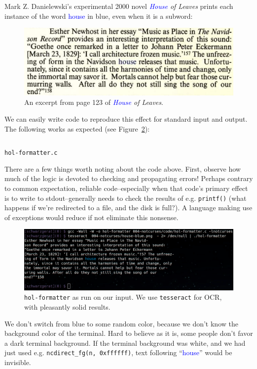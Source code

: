 \documentclass[letterpaper,10pt]{article}
\begin{document}
Mark Z. Danielewski's experimental 2000 novel \textit{\textcolor{blue}{House} of Leaves}\cite{danielewski2000house} prints each
instance of the word \textcolor{blue}{house} in blue, even when it is a subword:

\begin{figure}[!htbp]
\centering \includegraphics[width=.5\linewidth]{house-blue.png}
\caption{An excerpt from page 123 of \textit{\textcolor{blue}{House} of Leaves}.}
\label{fig:houseofleaves}
\end{figure}

We can easily write code to reproduce this effect for standard input and output.
The following works as expected (see Figure~\ref{fig:houseout}):

\begin{listing}[!htbp]
\inputminted[]{C}{code/hol-formatter.c}
\caption{\texttt{hol-formatter.c}}
\end{listing}

There are a few things worth noting about the code above. First, observe how
much of the logic is devoted to checking and propagating errors! Perhaps
contrary to common expectation, reliable code--especially when that code's
primary effect is to write to stdout--generally needs to check the results of
e.g. \texttt{printf()} (what happens if we're redirected to a file, and
the disk is full?). A language making use of exceptions would reduce if not
eliminate this nonsense.

\begin{figure}[!htbp]
\centering \includegraphics[width=.75\linewidth]{hol-formatted.png}
\caption{\texttt{hol-formatter} as run on our input. We use \texttt{tesseract} for OCR, with pleasantly solid results.}
\label{fig:houseout}
\end{figure}

We don't switch from blue to some random color, because we don't know the
background color of the terminal. Hard to believe as it is, some people don't
favor a dark terminal background. If the terminal background was white, and we
had just used e.g. \texttt{ncdirect\_fg(n, 0xffffff)}, text following
``\textcolor{blue}{house}'' would be invisible.
\end{document}
